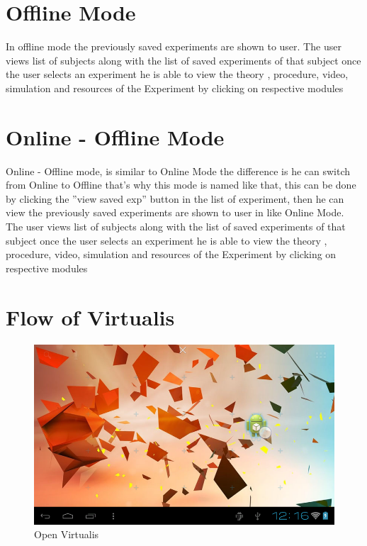 \documentclass[12pt]{report}
\begin{document}
\section{Offline Mode}

In offline mode the previously saved experiments are shown to user. The user views list of subjects along with the list of saved experiments of that subject once the user selects an experiment he is able to view the theory , procedure, video, simulation and resources of the Experiment by clicking on respective modules


\section{Online - Offline Mode}

Online - Offline mode, is similar to Online Mode the difference is he can switch from Online to Offline that's why this mode is named like that, this can be done by clicking the ''view saved exp'' button in the list of experiment, then he can view the previously saved experiments are shown to user in like Online Mode. The user views list of subjects along with the list of saved experiments of that subject once the user selects an experiment he is able to view the theory , procedure, video, simulation and resources of the Experiment by clicking on respective modules




\section{Flow of Virtualis}
\begin{figure}[H]
 \centering
 \includegraphics[width=15cm]{./1.png}
 \caption{Open Virtualis\label{fig:1}}
\end{figure}
\end{document}
